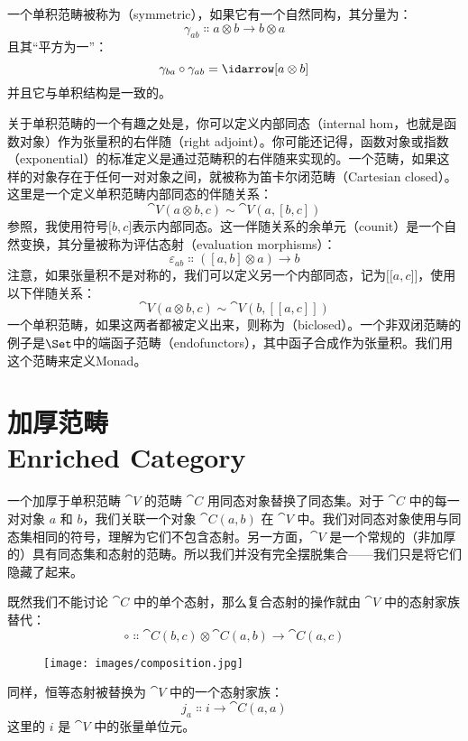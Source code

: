 \noindent
一个单积范畴被称为（symmetric），如果它有一个自然同构，其分量为：
\[\gamma_{a b} \Colon a \otimes b \to b \otimes a\]
且其``平方为一''：
\[\gamma_{b a} \circ \gamma_{a b} = \idarrow[a \otimes b]\]
并且它与单积结构是一致的。

关于单积范畴的一个有趣之处是，你可以定义内部同态（internal hom，也就是函数对象）作为张量积的右伴随（right adjoint）。你可能还记得，函数对象或指数（exponential）的标准定义是通过范畴积的右伴随来实现的。一个范畴，如果这样的对象存在于任何一对对象之间，就被称为笛卡尔闭范畴（Cartesian closed）。这里是一个定义单积范畴内部同态的伴随关系：
\[\cat{V}(a \otimes b, c) \sim \cat{V}(a, [b, c])\]
参照，我使用符号${[}b, c{]}$表示内部同态。这一伴随关系的余单元（counit）是一个自然变换，其分量被称为评估态射（evaluation morphisms）：
\[\varepsilon_{a b} \Colon ([a, b] \otimes a) \to b\]
注意，如果张量积不是对称的，我们可以定义另一个内部同态，记为${[}{[}a, c{]}{]}$，使用以下伴随关系：
\[\cat{V}(a \otimes b, c) \sim \cat{V}(b, [[a, c]])\]
一个单积范畴，如果这两者都被定义出来，则称为（biclosed）。一个非双闭范畴的例子是$\Set$中的端函子范畴（endofunctors），其中函子合成作为张量积。我们用这个范畴来定义Monad。

\section{加厚范畴\\ \textmd{Enriched Category}}

一个加厚于单积范畴 $\cat{V}$ 的范畴 $\cat{C}$ 用同态对象替换了同态集。对于 $\cat{C}$ 中的每一对对象 $a$ 和 $b$，我们关联一个对象 $\cat{C}(a, b)$ 在 $\cat{V}$ 中。我们对同态对象使用与同态集相同的符号，理解为它们不包含态射。另一方面，$\cat{V}$ 是一个常规的（非加厚的）具有同态集和态射的范畴。所以我们并没有完全摆脱集合——我们只是将它们隐藏了起来。

既然我们不能讨论 $\cat{C}$ 中的单个态射，那么复合态射的操作就由 $\cat{V}$ 中的态射家族替代：
\[\circ \Colon \cat{C}(b, c) \otimes \cat{C}(a, b) \to \cat{C}(a, c)\]

\begin{figure}[H]
  \centering
  \texttt{[image: images/composition.jpg]}
\end{figure}

\noindent
同样，恒等态射被替换为 $\cat{V}$ 中的一个态射家族：
\[j_a \Colon i \to \cat{C}(a, a)\]
这里的 $i$ 是 $\cat{V}$ 中的张量单位元。

